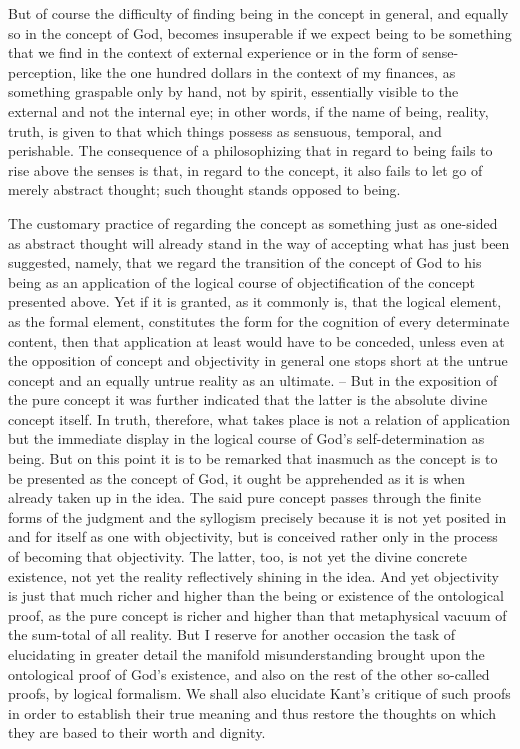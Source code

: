 But of course the difficulty of finding
being in the concept in general,
and equally so in the concept of God,
becomes insuperable if we expect being to
be something
that we find in the context of external experience
or in the form
of sense-perception,
like the one hundred dollars in the context of my finances,
as something graspable only by hand,
not by spirit, essentially visible to
the external and not the internal eye;
in other words, if the name of being,
reality, truth, is given to that which things possess as sensuous, temporal,
and perishable.
The consequence of a philosophizing that in regard to
being fails to rise above the senses is
that, in regard to the concept, it also
fails to let go of merely abstract thought;
such thought stands opposed to being.

The customary practice of regarding the concept as something just as
one-sided as abstract thought will already stand in the way of accepting what
has just been suggested,
namely, that we regard the transition of the concept
of God to his being as an application of the logical course of objectification
of the concept presented above.
 Yet if it is granted, as it commonly is,
that the logical element, as the formal element, constitutes the form for
the cognition of every determinate content, then that application at least
would have to be conceded, unless even at the opposition of concept and
objectivity in general one stops short at the untrue concept and an equally
untrue reality as an ultimate.
– But in the exposition of the pure concept it
was further indicated that the latter is the absolute divine concept itself.
In truth, therefore, what takes place is not a relation of application but
the immediate display in the logical course of God's self-determination as
being.
 But on this point it is to be remarked that inasmuch as the concept
is to be presented as the concept of God,
 it ought be apprehended as it is
when already taken up in the idea.
The said pure concept passes through
the finite forms of the judgment and the syllogism precisely because it is
not yet posited in and for itself as one with objectivity,
but is conceived
rather only in the process of becoming that objectivity.
 The latter, too, is
not yet the divine concrete existence,
not yet the reality reflectively shining
in the idea.
 And yet objectivity is just that much richer and higher than the
being or existence of the ontological proof,
as the pure concept is richer and
higher than that metaphysical vacuum of the sum-total of all reality.
But
I reserve for another occasion the task of elucidating in greater detail the
manifold misunderstanding brought upon the ontological proof of God's
existence,
and also on the rest of the other so-called proofs,
by logical formalism.
We shall also elucidate Kant's critique
of such proofs in order to establish their true meaning
and thus restore the thoughts on which they are based
to their worth and dignity.


